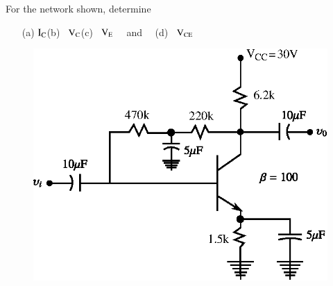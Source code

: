 \begin{problem}\label{prob3.9}
For the network shown, determine
\begin{itemize}
\item[(a)] $\textrm{I}_{\textrm{C}}$\quad (b)~ $\textrm{V}_{\textrm{C}}$\quad (c)~ $\textrm{V}_{\textrm{E}}$ \ \ and \ \ (d)~ $\textrm{V}_{\text{CE}}$
\end{itemize}
\begin{figure}[H]
\centering
\includegraphics[scale=.9]{chap3/fig3.18.eps}
\end{figure}
\end{problem}

